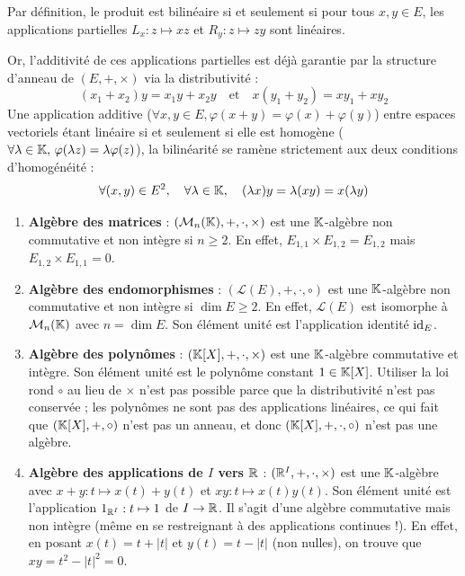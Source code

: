 \documentclass[11pt,a4paper]{report}
\begin{document}
\begin{methodbox}
    Par définition, le produit est bilinéaire si et seulement si pour tous $x, y \in E$, les applications partielles $L_x : z \mapsto xz$ et $R_y : z \mapsto zy$ sont linéaires.
    
    Or, l'additivité de ces applications partielles est déjà garantie par la structure d'anneau de $(E,+,\times)$ via la distributivité :
    \[
        (x_1 + x_2)y = x_1 y + x_2 y \quad \text{et} \quad x(y_1 + y_2) = xy_1 + xy_2
    \]
    Une application additive ($\forall x,y \in E, \varphi(x+y) = \varphi(x) + \varphi(y)$) entre espaces vectoriels étant linéaire si et seulement si elle est homogène ($\forall \lambda \in \mathbb{K}, \, \varphi(\lambda z) = \lambda \varphi(z)$), la bilinéarité se ramène strictement aux deux conditions d'homogénéité :
    \[
        \forall (x,y) \in E^2, \quad \forall \lambda \in \mathbb{K}, \quad (\lambda x)y = \lambda(xy) = x(\lambda y)
    \]
\end{methodbox}

\begin{example}
    \begin{enumerate}
        \item \textbf{Algèbre des matrices} : $(\mathcal M_n(\mathbb{K}),+,\cdot,\times)$ est une $\mathbb{K}$-algèbre non commutative et non intègre si $n \geq 2$. En effet, $E_{1,1} \times E_{1,2} = E_{1,2}$ mais $E_{1,2} \times E_{1,1} = 0$.
        \item \textbf{Algèbre des endomorphismes} : $(\mathcal L(E),+,\cdot,\circ)$ est une $\mathbb{K}$-algèbre non commutative et non intègre si $\dim E \geq 2$. En effet, $\mathcal L(E)$ est isomorphe à $\mathcal M_n(\mathbb{K})$ avec $n = \dim E$. Son élément unité est l'application identité $\mathrm{id}_E$.
        \item \textbf{Algèbre des polynômes} : $(\mathbb{K}[X],+,\cdot,\times)$ est une $\mathbb{K}$-algèbre commutative et intègre. Son élément unité est le polynôme constant $1 \in \mathbb{K}[X]$. Utiliser la loi rond $\circ$ au lieu de $\times$ n'est pas possible parce que la distributivité n'est pas conservée ; les polynômes ne sont pas des applications linéaires, ce qui fait que $(\mathbb{K}[X],+,\circ)$ n'est pas un anneau, et donc $(\mathbb{K}[X],+,\cdot,\circ)$ n'est pas une algèbre.
        \item \textbf{Algèbre des applications de $I$ vers $\mathbb{R}$} : $(\mathbb{R}^I, +,\cdot,\times)$ est une $\mathbb{K}$-algèbre avec $x+y : t \mapsto x(t) + y(t)$ et $xy : t \mapsto x(t)y(t)$. Son élément unité est l'application $1_{\mathbb{R}^I} : t \mapsto 1$ de $I \to \mathbb{R}$. Il s'agit d'une algèbre commutative mais non intègre (même en se restreignant à des applications continues !). En effet, en posant $x(t) = t + |t|$ et $y(t) = t - |t|$ (non nulles), on trouve que $xy = t^2 - |t|^2 = 0$.
    \end{enumerate}
\end{example}
\end{document}
